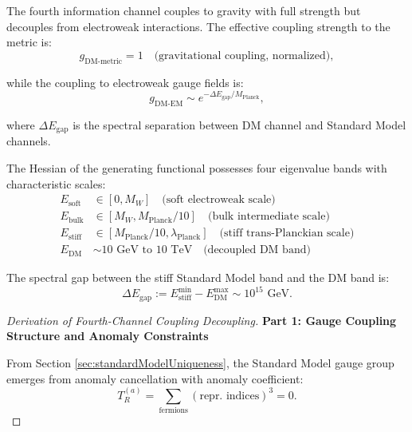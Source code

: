 \begin{theorem}
\label{thm:fourthChannelCouplingStrength}

The fourth information channel couples to gravity with full strength but decouples from electroweak interactions. The effective coupling strength to the metric is:
\begin{equation}
g_{\text{DM-metric}} = 1 \quad \text{(gravitational coupling, normalized)},
\end{equation}

while the coupling to electroweak gauge fields is:
\begin{equation}
g_{\text{DM-EM}} \sim e^{-\Delta E_{\text{gap}} / M_{\text{Planck}}},
\end{equation}

where $\Delta E_{\text{gap}}$ is the spectral separation between DM channel and Standard Model channels.

\begin{definition}

The Hessian of the generating functional possesses four eigenvalue bands with characteristic scales:
\begin{align}
E_{\text{soft}} &\in [0, M_W] \quad \text{(soft electroweak scale)} \\
E_{\text{bulk}} &\in [M_W, M_{\text{Planck}}/10] \quad \text{(bulk intermediate scale)} \\
E_{\text{stiff}} &\in [M_{\text{Planck}}/10, \lambda_{\text{Planck}}] \quad \text{(stiff trans-Planckian scale)} \\
E_{\text{DM}} &\sim 10 \text{ GeV} \text{ to } 10 \text{ TeV} \quad \text{(decoupled DM band)}
\end{align}

The spectral gap between the stiff Standard Model band and the DM band is:
\begin{equation}
\Delta E_{\text{gap}} := E_{\text{stiff}}^{\min} - E_{\text{DM}}^{\max} \sim 10^{15} \text{ GeV}.
\end{equation}

\end{definition}

\begin{proof}[Derivation of Fourth-Channel Coupling Decoupling]

\textbf{Part 1: Gauge Coupling Structure and Anomaly Constraints}

From Section \ref{sec:standardModelUniqueness}, the Standard Model gauge group emerges from anomaly cancellation with anomaly coefficient:
\begin{equation}
T_R^{(a)} = \sum_{\text{fermions}} (\text{repr. indices})^3 = 0.
\end{equation}


\end{proof}
\end{theorem}
